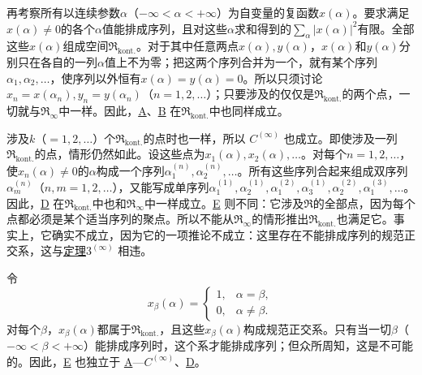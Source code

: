 \documentclass[fontsize=13pt,twoside,openany,headings=normal,parskip=false,bookmarkpackage=false,DIV=calc]{scrbook}
\begin{document}
再考察所有以连续参数$\alpha$（$-\infty<\alpha<+\infty$）为自变量的复函数$x(\alpha)$。要求满足$x(\alpha)\ne0$的各个$\alpha$值能排成序列，且对这些$\alpha$求和得到的$\sum_\alpha|x(\alpha)|^2$有限。全部这些$x(\alpha)$组成空间$\mathfrak{R}_{\mathrm{kont.}}$。对于其中任意两点$x(\alpha),\allowbreak y(\alpha)$，$x(\alpha)$和$y(\alpha)$分别只在各自的一列$\alpha$值上不为零；把这两个序列合并为一个，就有某个序列$\alpha_1,\allowbreak \alpha_2,\allowbreak \ldots$，使序列以外恒有$x(\alpha)=y(\alpha)=0$。所以只须讨论$x_n=x(\alpha_n),\allowbreak y_n=y(\alpha_n)$（$n=1,\allowbreak 2,\allowbreak \ldots$）；只要涉及的仅仅是$\mathfrak{R}_{\mathrm{kont.}}$的两个点，一切就与$\mathfrak{R}_\infty$中一样。因此，\hyperref[ax:II.A]{A}、\hyperref[ax:II.B]{B} 在$\mathfrak{R}_{\mathrm{kont.}}$中也同样成立。

\hypertarget{origpage-38}{}\label{origpage-38}涉及$k$（$=1,\allowbreak 2,\allowbreak \ldots$）个$\mathfrak{R}_{\mathrm{kont.}}$的点时也一样，所以 \hyperref[ax:II.Cinfty]{$C^{(\infty)}$} 也成立。即使涉及一列$\mathfrak{R}_{\mathrm{kont.}}$的点，情形仍然如此。设这些点为$x_1(\alpha),\allowbreak x_2(\alpha),\allowbreak \ldots$。对每个$n=1,\allowbreak 2,\allowbreak \ldots$，使$x_n(\alpha)\ne0$的$\alpha$构成一个序列$\alpha_1^{(n)},\allowbreak \alpha_2^{(n)},\allowbreak \ldots$。所有这些序列合起来组成双序列$\alpha_m^{(n)}$（$n,\allowbreak m=1,\allowbreak 2,\allowbreak \ldots$），又能写成单序列$\alpha_1^{(1)},\allowbreak \alpha_2^{(1)},\allowbreak \alpha_1^{(2)},\allowbreak \alpha_3^{(1)},\allowbreak \alpha_2^{(2)},\allowbreak \alpha_1^{(3)},\allowbreak \ldots$。因此，\hyperref[ax:II.D]{D} 在$\mathfrak{R}_{\mathrm{kont.}}$中也和$\mathfrak{R}_\infty$中一样成立。\hyperref[ax:II.E]{E} 则不同：它涉及$\mathfrak{R}$的全部点，因为每个点都必须是某个适当序列的聚点。所以不能从$\mathfrak{R}_\infty$的情形推出$\mathfrak{R}_{\mathrm{kont.}}$也满足它。事实上，它确实不成立，因为它的一项推论不成立：这里存在不能排成序列的规范正交系，这与\CJKglue \hyperref[thm:II.3infty]{定理$3^{(\infty)}$} 相违。

令
\[
x_\beta(\alpha)=\begin{cases}1,&\alpha=\beta,\\0,&\alpha\ne\beta.\end{cases}
\]
对每个$\beta$，$x_\beta(\alpha)$都属于$\mathfrak{R}_{\mathrm{kont.}}$，且这些$x_\beta(\alpha)$构成规范正交系。只有当一切$\beta$（$-\infty<\beta<+\infty$）能排成序列时，这个系才能排成序列；但众所周知，这是不可能的。因此，\hyperref[ax:II.E]{E} 也独立于 \hyperref[ax:II.A]{A}—\hyperref[ax:II.Cinfty]{$C^{(\infty)}$}、\hyperref[ax:II.D]{D}。
\end{document}
